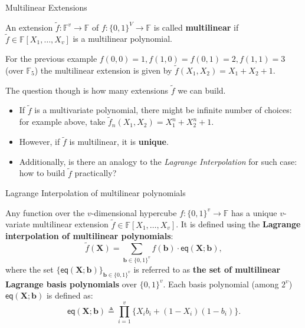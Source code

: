 \documentclass{zkdl-presentation-template}
\begin{document}
    \begin{frame}{Multilinear Extensions}
        \begin{definition}[MLE]
            An extension $\widetilde{f}: \mathbb{F}^v \to \mathbb{F}$ of $f:
            \{0,1\}^V \to \mathbb{F}$ is called \textbf{multilinear} if
            $\widetilde{f} \in \mathbb{F}[X_1,\dots,X_v]$ is a multilinear
            polynomial.
        \end{definition}

        \begin{example}
            For the previous example $f(0,0)=1, f(1,0)=f(0,1)=2, f(1,1)=3$
            (over $\mathbb{F}_5$) the multilinear extension is given by
            $\widetilde{f}(X_1,X_2) = X_1 + X_2 + 1$.
        \end{example}

        The question though is how many extensions $\widetilde{f}$ we can 
        build.
        \begin{itemize}
            \item If $\widetilde{f}$ is a multivariate polynomial, there might
            be infinite number of choices: for example above, take
            $\widetilde{f}_n(X_1,X_2) = X_1^n + X_2^n + 1$.
            \item However, if $\widetilde{f}$ is multilinear, it is
            \textbf{unique}.
            \item Additionally, is there an analogy to the \textit{Lagrange
            Interpolation} for such case: how to build $\widetilde{f}$
            practically?
        \end{itemize}
    \end{frame}

    \begin{frame}{Lagrange Interpolation of multilinear polynomials}
        \begin{theorem}
            Any function over the $v$-dimensional hypercube $f: \{0,1\}^v \to
            \mathbb{F}$ has a unique $v$-variate multilinear extension $\widetilde{f}
            \in \mathbb{F}[X_1,\dots,X_v]$. It is defined using the \textbf{Lagrange
            interpolation of multilinear polynomials}:
            \begin{equation*}
                \widetilde{f}(\mathbf{X}) = \sum_{\boldsymbol{b} \in \{0,1\}^v} f(\boldsymbol{b}) \cdot \mathsf{eq}(\mathbf{X};\boldsymbol{b}),
            \end{equation*}
            where the set $\{\mathsf{eq}(\mathbf{X};
            \boldsymbol{b})\}_{\boldsymbol{b} \in \{0,1\}^v}$ is referred to as
            \textbf{the set of multilinear Lagrange basis polynomials} over
            $\{0,1\}^v$. Each basis polynomial (among $2^v$)
            $\mathsf{eq}(\mathbf{X};\boldsymbol{b})$ is defined as:
            \begin{equation*}
                \mathsf{eq}(\mathbf{X};\boldsymbol{b}) \triangleq \prod_{i=1}^v \{X_ib_i + (1-X_i)(1-b_i) \}.
            \end{equation*}
        \end{theorem}
    \end{frame}
\end{document}
